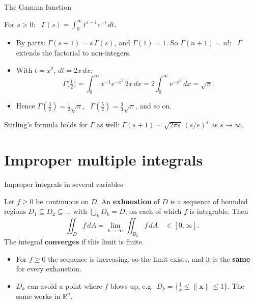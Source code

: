 \documentclass[10pt]{wosm-slides}
\newcommand{\R}{\mathbb{R}}
\newcommand{\dA}{\, dA}
\newcommand{\norm}[1]{\lVert #1 \rVert}
\newcommand{\vx}{\mathbf{x}}
\begin{document}
\begin{frame}{The Gamma function}
  \begin{definition}
    For $s > 0$: \ $\displaystyle \Gamma(s) = \int_0^\infty t^{s - 1} e^{-t}\, dt$.
  \end{definition}
  \pause
  \begin{itemize}
    \item By parts: $\Gamma(s + 1) = s\,\Gamma(s)$, and $\Gamma(1) = 1$. So $\Gamma(n + 1) = n!$: \ $\Gamma$
      extends the factorial to non-integers.
    \pause
    \item With $t = x^2$, $dt = 2x\, dx$:
      \[ \Gamma\bigl(\tfrac12\bigr) = \int_0^\infty x^{-1} e^{-x^2}\, 2x\, dx = 2 \int_0^\infty e^{-x^2}\, dx = \sqrt\pi . \]
    \item Hence $\Gamma(\frac32) = \frac12 \sqrt\pi$, \ $\Gamma(\frac52) = \frac34 \sqrt\pi$, and so on.
  \end{itemize}
  \pause
  {\small Stirling's formula holds for $\Gamma$ as well: $\Gamma(s + 1) \sim \sqrt{2\pi s}\,(s/e)^s$ as
  $s \to \infty$.\par}
\end{frame}

\section{Improper multiple integrals}

\begin{frame}{Improper integrals in several variables}
  \begin{definition}
    Let $f \ge 0$ be continuous on $D$. An \textbf{exhaustion} of $D$ is a sequence of bounded regions
    $D_1 \subseteq D_2 \subseteq \dots$ with $\bigcup_k D_k = D$, on each of which $f$ is integrable. Then
    \[ \iint_D f \dA = \lim_{k \to \infty} \iint_{D_k} f \dA \quad \in [0, \infty] . \]
    The integral \textbf{converges} if this limit is finite.
  \end{definition}
  \pause
  \begin{itemize}
    \item For $f \ge 0$ the sequence is increasing, so the limit exists, and it is the \textbf{same} for
      every exhaustion.
    \item $D_k$ can avoid a point where $f$ blows up, e.g.\ $D_k = \{\frac1k \le \norm{\vx} \le 1\}$.
      The same works in $\R^n$.
  \end{itemize}
\end{frame}
\end{document}
